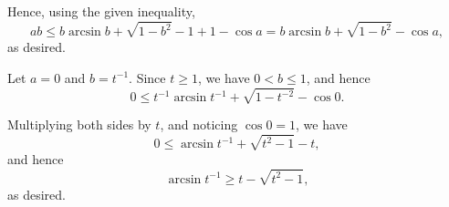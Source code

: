 \begin{enumerate}
          Hence, using the given inequality,
          \[
              ab \leq b \arcsin b + \sqrt{1 - b^2} - 1 + 1 - \cos a = b \arcsin b + \sqrt{1 - b^2} - \cos a,
          \]
          as desired.

          Let \(a = 0\) and \(b = t^{-1}\). Since \(t \geq 1\), we have \(0 < b \leq 1\), and hence
          \[
              0 \leq t^{-1} \arcsin t^{-1} + \sqrt{1 - t^{-2}} - \cos 0.
          \]

          Multiplying both sides by \(t\), and noticing \(\cos 0  = 1\), we have
          \[
              0 \leq \arcsin t^{-1} + \sqrt{t^2 - 1} - t,
          \]
          and hence
          \[
              \arcsin t^{-1} \geq t - \sqrt{t^2 - 1},
          \]
          as desired.
\end{enumerate}